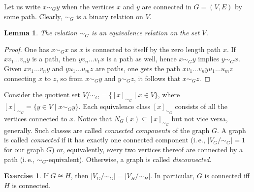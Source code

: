 \documentclass[12pt,notitlepage]{article}
\theoremstyle{plain}
\newtheorem{lemma}[thm]{Lemma}
\theoremstyle{definition}
\newtheorem{exc}[thm]{Exercise}
\theoremstyle{plain}
\newcommand{\sbs}{\subseteq}
\newcommand{\1}{\mathbf{1}}
\newcommand{\0}{\mathbf{0}}
\begin{document}
Let us write $x \sim_G y$ when the vertices $x$ and $y$ are connected in $G = (V, E)$ by some path. Clearly, ${\sim_G}$ is a binary relation on $V$.

\begin{lemma}
The relation ${\sim_G}$ is an equivalence relation on the set $V$.
\end{lemma}
\begin{proof}
One has $x \sim_G x$ as $x$ is connected to itself by the zero length path $x$. If $x v_1 \ldots v_n y$ is a path, then $y v_n \ldots v_1 x$ is a path as well, hence $x \sim_G y$ implies $y \sim_G x$. Given $x v_1 \ldots v_n y$ and $y u_1 \ldots u_m z$ are paths, one gets the path $x v_1 \ldots v_n y u_1 \ldots u_m z$ connecting $x$ to $z$, so from $x \sim_G y$ and $y \sim_G z$, it follows that $x \sim_G z$.
\end{proof}

Consider the quotient set $V / {\sim_G} = \{ [x]_{\sim_G} \mid x \in V \}$, where $[x]_{\sim_G} = \{ y \in V \mid x \sim_G y \}$. Each equivalence class $[x]_{\sim_G}$ consists of all the vertices connected to $x$. Notice that $N_G(x) \sbs [x]_{\sim_G}$ but not vice versa, generally. Such classes are called \emph{connected components} of the graph $G$. A graph is called \emph{connected} if it has exactly one connected component (i.\,e., $|V_G / {\sim_G}| = 1$ for our graph $G$) or, equivalently, every two vertices thereof are connected by a path (i.\,e., ${\sim_G}$-equivalent). Otherwise, a graph is called \emph{disconnected}.

\begin{exc}
If $G \cong H$, then $|V_G / {\sim_G}| = |V_H / {\sim_H}|$. In particular, $G$ is connected iff $H$ is connected.
\end{exc}
\end{document}
